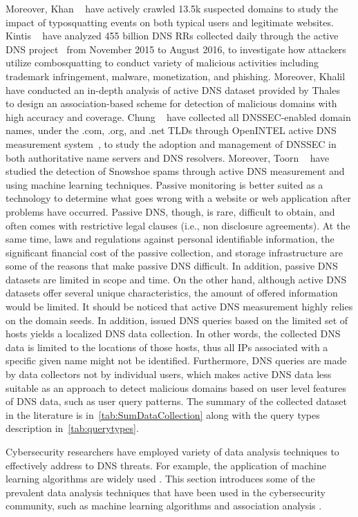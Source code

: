 Moreover, Khan \etal~ have actively crawled 13.5k suspected domains to study the impact of typosquatting events on both typical users and legitimate websites. Kintis \etal~ have analyzed 455 billion DNS RRs collected daily through the active DNS project~ from November 2015 to August 2016, to investigate how attackers utilize combosquatting to conduct variety of malicious activities including trademark infringement, malware, monetization, and phishing. Moreover, Khalil \etal~ have conducted an in-depth analysis of active DNS dataset provided by Thales~ to design an association-based scheme for detection of malicious domains with high accuracy and coverage.
Chung \etal~ have collected all DNSSEC-enabled domain names, under the .com, .org, and .net TLDs through OpenINTEL active DNS measurement system~, to study the adoption and management of DNSSEC in both authoritative name servers and DNS resolvers. Moreover, Toorn \etal ~ have studied the detection of Snowshoe spams through active DNS measurement and using machine learning techniques. 
 Passive monitoring is better suited as a technology to determine what goes wrong with a website or web application after problems have occurred. Passive DNS, though, is rare, difficult to obtain, and often comes with restrictive legal clauses (i.e., non disclosure agreements). At the same time, laws and regulations against personal identifiable information, the significant financial cost of the passive collection, and storage infrastructure are some of the reasons that make passive DNS difficult. In addition, passive DNS datasets are limited in scope and time. On the other hand, although active DNS datasets offer several unique characteristics, the amount of offered information would be limited. It should be noticed that active DNS measurement highly relies on the domain seeds. In addition, issued DNS queries based on the limited set of hosts yields a localized DNS data collection. In other words, the collected DNS data is limited to the locations of those hosts, thus all IPs associated with a specific given name might not be identified. Furthermore, DNS queries are made by data collectors not by individual users, which makes active DNS data less suitable as an approach to detect malicious domains based on user level features of DNS data, such as user query patterns. The summary of the collected dataset in the literature is in~\autoref{tab:SumDataCollection} along with the query types description in~\autoref{tab:querytypes}.

Cybersecurity researchers have employed variety of data analysis techniques to effectively address to DNS threats. For example, the application of machine learning algorithms are widely used . This section introduces some of the prevalent data analysis techniques that have been used in the cybersecurity community, such as machine learning algorithms  and association analysis .

